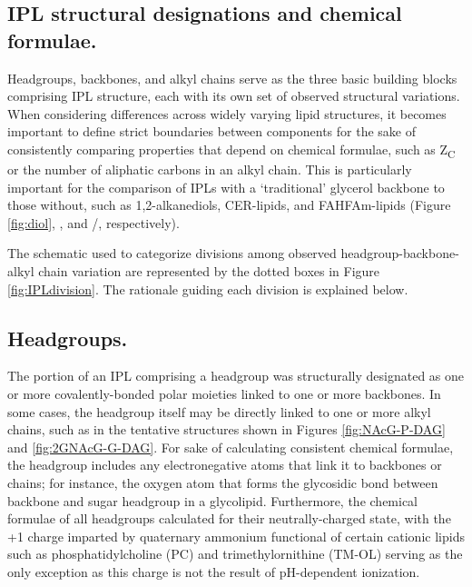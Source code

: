 \subsection{IPL structural designations and chemical formulae.} Headgroups, backbones, and alkyl chains serve as the three basic building blocks comprising IPL structure, each with its own set of observed structural variations. When considering differences across widely varying lipid structures, it becomes important to define strict boundaries between components for the sake of consistently comparing properties that depend on chemical formulae, such as Z\textsubscript{C} or the number of aliphatic carbons in an alkyl chain. This is particularly important for the comparison of IPLs with a `traditional' glycerol backbone to those without, such as 1,2-alkanediols, CER-lipids, and FAHFAm-lipids (Figure \ref{fig:diol}, , and /, respectively).

The schematic used to categorize divisions among observed headgroup-backbone-alkyl chain variation are represented by the dotted boxes in Figure \ref{fig:IPLdivision}. The rationale guiding each division is explained below.




\subsection{Headgroups.} The portion of an IPL comprising a headgroup was structurally designated as one or more covalently-bonded polar moieties linked to one or more backbones. In some cases, the headgroup itself may be directly linked to one or more alkyl chains, such as in the tentative structures shown in Figures \ref{fig:NAcG-P-DAG} and \ref{fig:2GNAcG-G-DAG}. For sake of calculating consistent chemical formulae, the headgroup includes any electronegative atoms that link it to backbones or chains; for instance, the oxygen atom that forms the glycosidic bond between backbone and sugar headgroup in a glycolipid. Furthermore, the chemical formulae of all headgroups calculated for their neutrally-charged state, with the +1 charge imparted by quaternary ammonium functional of certain cationic lipids such as phosphatidylcholine (PC) and trimethylornithine (TM-OL) serving as the only exception as this charge is not the result of pH-dependent ionization.

